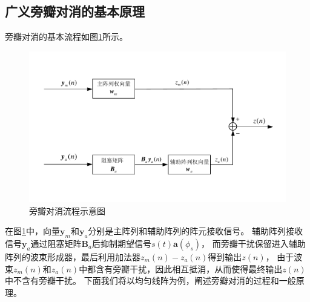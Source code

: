 \documentclass[master]{thesis-uestc}
\begin{document}
\subsection{广义旁瓣对消的基本原理}
旁瓣对消的基本流程如图\ref{GSC_process}所示。
\begin{figure}[h]
    \includegraphics[scale=0.8]{pic/GSC_process.pdf}
    \caption{旁瓣对消流程示意图}
    \label{GSC_process}
\end{figure}
在图\ref{GSC_process}中，向量$\bm{y}_m$和$\bm{y}_a$分别是主阵列和辅助阵列的阵元接收信号。
辅助阵列接收信号$\bm{y}_a$通过阻塞矩阵$\bm{B}_a$后抑制期望信号$s(t)\bm{a}(\phi_s)$，
而旁瓣干扰保留进入辅助阵列的波束形成器，最后利用加法器$z_m(n)-z_a(n)$得到输出$z(n)$，
由于波束$z_m(n)$和$z_a(n)$中都含有旁瓣干扰，因此相互抵消，从而使得最终输出$z(n)$中不含有旁瓣干扰。
下面我们将以均匀线阵为例，阐述旁瓣对消的过程和一般原理。
\end{document}

